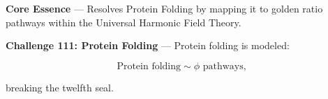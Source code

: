 
\textbf{Core Essence} --- Resolves Protein Folding by mapping it to golden ratio pathways within the Universal Harmonic Field Theory.

\textbf{Challenge 111: Protein Folding} --- Protein folding is modeled:

$$
\text{Protein folding} \sim \phi \text{ pathways,}
$$

breaking the twelfth seal.

